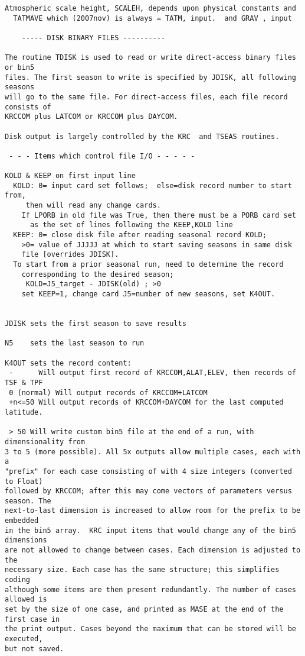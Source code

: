 \begin{verbatim}
Atmospheric scale height, SCALEH, depends upon physical constants and 
  TATMAVE which (2007nov) is always = TATM, input.  and GRAV , input

	----- DISK BINARY FILES ----------

The routine TDISK is used to read or write direct-access binary files or bin5
files. The first season to write is specified by JDISK, all following seasons
will go to the same file. For direct-access files, each file record consists of
KRCCOM plus LATCOM or KRCCOM plus DAYCOM.

Disk output is largely controlled by the KRC  and TSEAS routines.

 - - - Items which control file I/O - - - - -

KOLD & KEEP on first input line
  KOLD: 0= input card set follows;  else=disk record number to start from,
	 then will read any change cards.
	If LPORB in old file was True, then there must be a PORB card set 
	  as the set of lines following the KEEP,KOLD line
  KEEP: 0= close disk file after reading seasonal record KOLD;  
	>0= value of JJJJJ at which to start saving seasons in same disk 
	file [overrides JDISK].
  To start from a prior seasonal run, need to determine the record 
	corresponding to the desired season;
	 KOLD=J5_target - JDISK(old) ; >0
	set KEEP=1, change card J5=number of new seasons, set K4OUT.


JDISK sets the first season to save results

N5    sets the last season to run

K4OUT sets the record content:
 -      Will output first record of KRCCOM,ALAT,ELEV, then records of TSF & TPF
 0 (normal) Will output records of KRCCOM+LATCOM
 +n<=50 Will output records of KRCCOM+DAYCOM for the last computed latitude.

 > 50 Will write custom bin5 file at the end of a run, with dimensionality from
3 to 5 (more possible). All 5x outputs allow multiple cases, each with a
"prefix" for each case consisting of with 4 size integers (converted to Float)
followed by KRCCOM; after this may come vectors of parameters versus season. The
next-to-last dimension is increased to allow room for the prefix to be embedded
in the bin5 array.  KRC input items that would change any of the bin5 dimensions
are not allowed to change between cases. Each dimension is adjusted to the
necessary size. Each case has the same structure; this simplifies coding
although some items are then present redundantly. The number of cases allowed is
set by the size of one case, and printed as MASE at the end of the first case in
the print output. Cases beyond the maximum that can be stored will be executed,
but not saved.


\end{verbatim}
